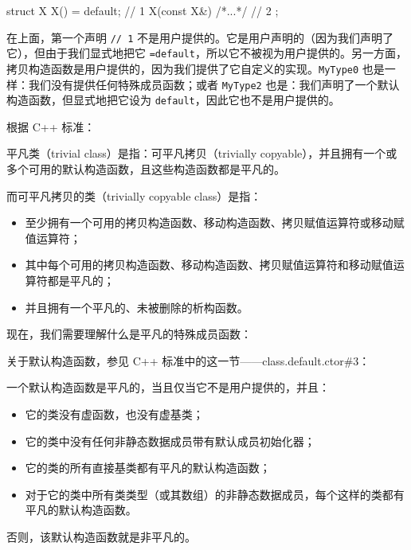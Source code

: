 \begin{codebox}[cpp]
struct X {
X() = default;
// 1
X(const X&) { /*...*/ }
// 2
};
\end{codebox}

在上面，第一个声明 \texttt{// 1} 不是用户提供的。它是用户声明的（因为我们声明了它），但由于我们显式地把它 \texttt{=default}，所以它不被视为用户提供的。另一方面，拷贝构造函数是用户提供的，因为我们提供了它自定义的实现。\texttt{MyType0} 也是一样：我们没有提供任何特殊成员函数；或者 \texttt{MyType2} 也是：我们声明了一个默认构造函数，但显式地把它设为 \texttt{default}，因此它也不是用户提供的。

根据 C++ 标准：

\begin{myQuote}
平凡类（trivial class）是指：可平凡拷贝（trivially copyable），并且拥有一个或多个可用的默认构造函数，且这些构造函数都是平凡的。
\end{myQuote}

\begin{myQuote}
而可平凡拷贝的类（trivially copyable class）是指：

\begin{itemize}
\item 至少拥有一个可用的拷贝构造函数、移动构造函数、拷贝赋值运算符或移动赋值运算符；
\item 其中每个可用的拷贝构造函数、移动构造函数、拷贝赋值运算符和移动赋值运算符都是平凡的；
\item 并且拥有一个平凡的、未被删除的析构函数。
\end{itemize}
\end{myQuote}

现在，我们需要理解什么是平凡的特殊成员函数：

关于默认构造函数，参见 C++ 标准中的这一节——class.default.ctor\#3：

\begin{myQuote}
一个默认构造函数是平凡的，当且仅当它不是用户提供的，并且：

\begin{itemize}
\item 它的类没有虚函数，也没有虚基类；
\item 它的类中没有任何非静态数据成员带有默认成员初始化器；
\item 它的类的所有直接基类都有平凡的默认构造函数；
\item 对于它的类中所有类类型（或其数组）的非静态数据成员，每个这样的类都有平凡的默认构造函数。
\end{itemize}

否则，该默认构造函数就是非平凡的。
\end{myQuote}

